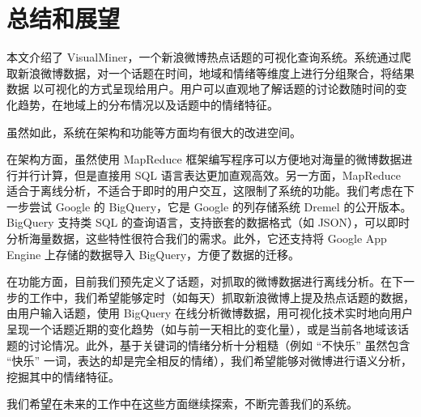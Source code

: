 \chapter{总结和展望}
\thispagestyle{fancy}
本文介绍了 VisualMiner，一个新浪微博热点话题的可视化查询系统。系统通过爬取新浪微博数据，对一个话题在时间，地域和情绪等维度上进行分组聚合，将结果数据 以可视化的方式呈现给用户。用户可以直观地了解话题的讨论数随时间的变化趋势，在地域上的分布情况以及话题中的情绪特征。

虽然如此，系统在架构和功能等方面均有很大的改进空间。

在架构方面，虽然使用 MapReduce 框架编写程序可以方便地对海量的微博数据进行并行计算，但是直接用 SQL 语言表达更加直观高效。另一方面，MapReduce 适合于离线分析，不适合于即时的用户交互，这限制了系统的功能。我们考虑在下一步尝试 Google 的 BigQuery\cite{bigquery}，它是 Google 的列存储系统 Dremel\cite{dremel} 的公开版本。BigQuery 支持类 SQL 的查询语言，支持嵌套的数据格式（如 JSON），可以即时分析海量数据，这些特性很符合我们的需求。此外，它还支持将 Google App Engine 上存储的数据导入 BigQuery，方便了数据的迁移。

在功能方面，目前我们预先定义了话题，对抓取的微博数据进行离线分析。在下一步的工作中，我们希望能够定时（如每天）抓取新浪微博上提及热点话题的数据，由用户输入话题，使用 BigQuery 在线分析微博数据，用可视化技术实时地向用户呈现一个话题近期的变化趋势（如与前一天相比的变化量），或是当前各地域该话题的讨论情况。此外，基于关键词的情绪分析十分粗糙（例如 “不快乐” 虽然包含 
“快乐” 一词，表达的却是完全相反的情绪），我们希望能够对微博进行语义分析，挖掘其中的情绪特征。

我们希望在未来的工作中在这些方面继续探索，不断完善我们的系统。




